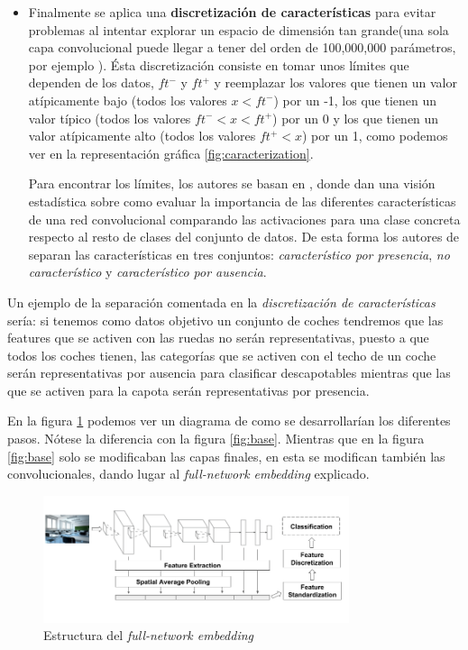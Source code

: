 \documentclass[12,twoside]{TFG-GM}
\theoremstyle{definition}
\theoremstyle{remark}
\begin{document}
\begin{itemize}
\item Finalmente se aplica una \textbf{discretización de características} para evitar problemas al intentar explorar un espacio de dimensión tan grande(una sola capa convolucional puede llegar a tener del orden de 100,000,000 parámetros, por ejemplo \cite{cnnexample}). Ésta discretización consiste en tomar unos límites que dependen de los datos, $ft^-$ y $ft^+$ y reemplazar los valores que tienen un valor atípicamente bajo (todos los valores $x < ft^-$) por un -1, los que tienen un valor típico (todos los valores $ ft^- < x < ft^+$) por un 0 y los que tienen un valor atípicamente alto (todos los valores $ ft^+ < x$) por un 1, como podemos ver en la representación gráfica \ref{fig:caracterization}. 

Para encontrar los límites, los autores se basan en \cite{behaviourcnn}, donde dan una visión estadística sobre como evaluar la importancia de las diferentes características de una red convolucional comparando las activaciones para una clase concreta respecto al resto de clases del conjunto de datos. De esta forma los autores de \cite{behaviourcnn} separan las características en tres conjuntos: \textit{característico por presencia}, \textit{no característico} y \textit{característico por ausencia}.
\end{itemize}

Un ejemplo de la separación comentada en la \textit{discretización de características} sería: si tenemos como datos objetivo un conjunto de coches tendremos que las features que se activen con las ruedas no serán representativas, puesto a que todos los coches tienen, las categorías que se activen con el techo de un coche serán representativas por ausencia para clasificar descapotables mientras que las que se activen para la capota serán representativas por presencia.


En la figura \ref{fig:fnediagram} podemos ver un diagrama de como se desarrollarían los diferentes pasos. Nótese la diferencia con la figura \ref{fig:base}. Mientras que en la figura \ref{fig:base} solo se modificaban las capas finales, en esta  se modifican también las convolucionales, dando lugar al \textit{full-network embedding} explicado.

\begin{figure}[h]
\label{fig:fne}
\centering
\includegraphics[width = 0.8\textwidth]{Images/cropfne.png} 
\caption{Estructura del \textit{full-network embedding}\label{fig:fnediagram}}
\end{figure}
\end{document}
